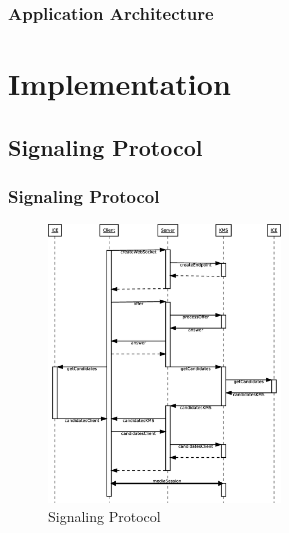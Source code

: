 \documentclass[compress]{beamer}
\begin{document}
		\begin{frame}[c]

		\frametitle{Application Architecture}

\begin{table}[H]
\centering
	\caption{Application Architecture}
	\label{table:apparch}

\end{table}


		\end{frame}


\section{Implementation}\label{meth} %

\subsection{Signaling Protocol}
\begin{frame}[c]
		\frametitle{Signaling Protocol}
		\begin{figure}[H]
			\includegraphics[width=0.55\textwidth]{figures/signaling.eps}
			\caption{Signaling Protocol}
		\end{figure}
\end{frame}
\end{document}
